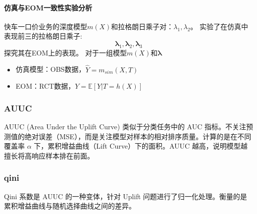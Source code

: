 \documentclass[12pt, a4paper]{article}
\begin{document}
\paragraph{仿真与EOM一致性实验分析}

快车一口价业务的深度模型$m(X)$和拉格朗日乘子对：$\lambda_1,\lambda_2$。
实验了在仿真中表现前三的拉格朗日乘子:$$\bm{\lambda}_1,\bm{\lambda}_2,\bm{\lambda}_3$$探究其在EOM上的表现。
对于一组模型$m(X)$和$\bm \lambda$
\begin{itemize}
    \item 仿真模型：OBS数据，$\hat Y=m_{sim}(X,T)$
    \item EOM：RCT数据，$Y= \mathbb{E}[Y|T=h(X)]$
\end{itemize}
\begin{table}[htbp]
\centering
\caption{仿真指标与 EOM 指标对比}
\label{tab:comparison}
\end{table}
\subsubsection{AUUC}
AUUC (Area Under the Uplift Curve) 类似于分类任务中的 AUC 指标。不关注预测值的绝对误差（MSE），而是关注模型对样本的相对排序质量。计算的是在不同覆盖率 $\alpha$ 下，累积增益曲线（Lift Curve）下的面积。AUUC 越高，说明模型越擅长将高响应样本排在前面。

\subsubsection{qini}
Qini 系数是 AUUC 的一种变体，针对 Uplift 问题进行了归一化处理。衡量的是累积增益曲线与随机选择曲线之间的差异。
\end{document}
